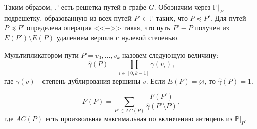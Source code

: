 \documentclass[../thesis.tex]{subfiles}
\begin{document}
Таким образом, $\mathbb{P}$ есть решетка путей в графе $G$.
Обозначим через $\mathbb{P}|_P$ подрешетку, образованную из всех путей $P'\in \mathbb{P}$ таких, что $P\preceq P'$.
Для путей $P\preceq P'$ определена операция <<$-$>> такая, что путь $P' - P$ получен из $E(P') \setminus E(P)$ удалением вершин с нулевой степенью.

\begin{definition}
Мультипликатором пути $P=v_0,\dots,v_k$ назовем следующую величину:
\begin{equation}
    \hat{\gamma}(P) = \prod_{i\in [0,k-1]} {\gamma(v_i)},
\end{equation}
где $\gamma(v)$ - степень дублирования вершины $v$.
Если $E(P) = \varnothing$, то $\hat{\gamma}(P) = 1$.
\end{definition}

\begin{theorem} \label{th:antichain}
\begin{equation} \label{eq:antichain}
    F(P) = \sum_{P'\in AC(P)} {\frac{F(P')}{\hat{\gamma}(P'\setminus P)}},
\end{equation}
где $AC(P)$ есть произвольная максимальная по включению антицепь из $\mathbb{P}|_P$.
\end{theorem}
\end{document}
